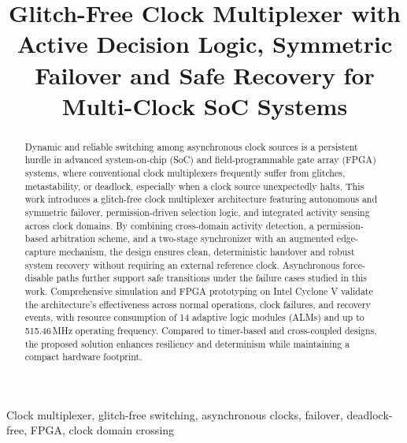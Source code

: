 \documentclass[conference]{IEEEtran}
\begin{document}
\title{Glitch-Free Clock Multiplexer with Active Decision Logic, Symmetric Failover and Safe Recovery for Multi-Clock SoC Systems}


\author{
\vspace*{-1.0cm}
}

\maketitle

\begin{abstract}
Dynamic and reliable switching among asynchronous clock sources is a persistent hurdle in advanced system-on-chip (SoC) and field-programmable gate array (FPGA) systems, where conventional clock multiplexers frequently suffer from glitches, metastability, or deadlock, especially when a clock source unexpectedly halts. This work introduces a glitch-free clock multiplexer architecture featuring autonomous and symmetric failover, permission-driven selection logic, and integrated activity sensing across clock domains. By combining cross-domain activity detection, a permission-based arbitration scheme, and a two-stage synchronizer with an augmented edge-capture mechanism, the design ensures clean, deterministic handover and robust system recovery without requiring an external reference clock. Asynchronous force-disable paths further support safe transitions under the failure cases studied in this work. Comprehensive simulation and FPGA prototyping on Intel Cyclone V validate the architecture’s effectiveness across normal operations, clock failures, and recovery events, with resource consumption of 14 adaptive logic modules (ALMs) and up to 515.46\,MHz operating frequency. Compared to timer-based and cross-coupled designs, the proposed solution enhances resiliency and determinism while maintaining a compact hardware footprint.
\end{abstract}

\begin{IEEEkeywords}
Clock multiplexer, glitch-free switching, asynchronous clocks, failover, deadlock-free, FPGA, clock domain crossing
\end{IEEEkeywords}
\end{document}

